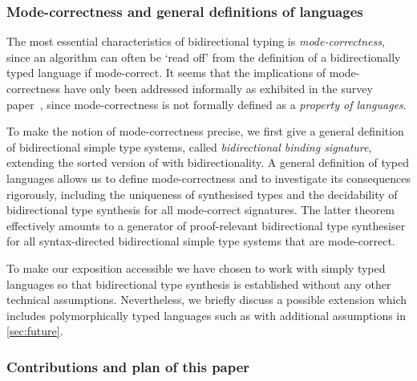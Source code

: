 
\subsubsection{Mode-correctness and general definitions of languages}
\label{sec:language-formalisation}
The most essential characteristics of bidirectional typing is \emph{mode-correctness}, since an algorithm can often be `read off' from the definition of a bidirectionally typed language if mode-correct.
It seems that the implications of mode-correctness have only been addressed informally as exhibited in the survey paper~\cite{Dunfield2021}, since mode-correctness is not formally defined as a \emph{property of languages}.

To make the notion of mode-correctness precise, we first give a general definition of bidirectional simple type systems, called \emph{bidirectional binding signature}, extending the sorted version of  with bidirectionality.
A general definition of typed languages allows us to define mode-correctness and to investigate its consequences rigorously, including the uniqueness of synthesised types and the decidability of bidirectional type synthesis for all mode-correct signatures.
The latter theorem effectively amounts to a generator of proof-relevant bidirectional type synthesiser for all syntax-directed bidirectional simple type systems that are mode-correct.


To make our exposition accessible we have chosen to work with simply typed languages so that bidirectional type synthesis is established without any other technical assumptions.
Nevertheless, we briefly discuss a possible extension which includes polymorphically typed languages such as \SystemF with additional assumptions in \cref{sec:future}.

\subsubsection{Contributions and plan of this paper}

